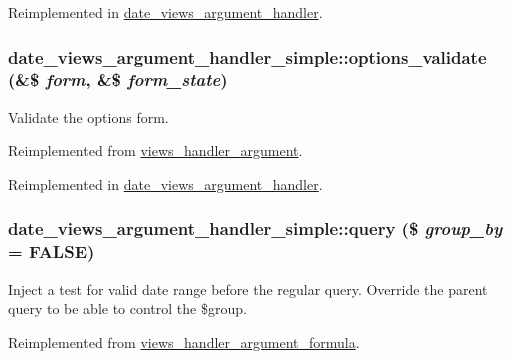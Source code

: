 Reimplemented in \hyperlink{classdate__views__argument__handler_a590b98bc076d465f778862b82c76f6e5}{date\_\-views\_\-argument\_\-handler}.\hypertarget{classdate__views__argument__handler__simple_a69e0df0155f42ffff2722fa1bc4b7f7b}{
\subsubsection[{options\_\-validate}]{\setlength{\rightskip}{0pt plus 5cm}date\_\-views\_\-argument\_\-handler\_\-simple::options\_\-validate (\&\$ {\em form}, \/  \&\$ {\em form\_\-state})}}
\label{classdate__views__argument__handler__simple_a69e0df0155f42ffff2722fa1bc4b7f7b}
Validate the options form. 

Reimplemented from \hyperlink{classviews__handler__argument_a0d5e9e31111cfc98588f59fc9d031cc6}{views\_\-handler\_\-argument}.

Reimplemented in \hyperlink{classdate__views__argument__handler_ae970be5da3129fef9deaf4ccc2274e6c}{date\_\-views\_\-argument\_\-handler}.\hypertarget{classdate__views__argument__handler__simple_a284da1e34334bd9086194eef7a803d27}{
\subsubsection[{query}]{\setlength{\rightskip}{0pt plus 5cm}date\_\-views\_\-argument\_\-handler\_\-simple::query (\$ {\em group\_\-by} = {\ttfamily FALSE})}}
\label{classdate__views__argument__handler__simple_a284da1e34334bd9086194eef7a803d27}
Inject a test for valid date range before the regular query. Override the parent query to be able to control the \$group. 

Reimplemented from \hyperlink{classviews__handler__argument__formula_aa8108173e62c8c7dfb17e734dce537b5}{views\_\-handler\_\-argument\_\-formula}.

